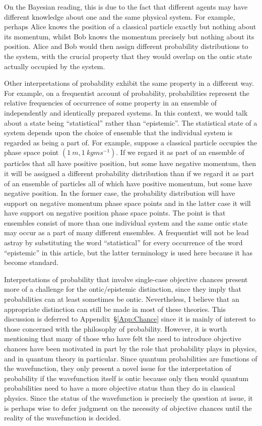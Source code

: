\documentclass[DIV=calc,paper=a4,fontsize=11pt,twocolumn]{scrartcl} %
\theoremstyle{definition}
\theoremstyle{plain}
\begin{document}
On the Bayesian reading, this is due to the fact
that different agents may have different knowledge about one and the
same physical system.  For example, perhaps Alice knows the position
of a classical particle exactly but nothing about its momentum, whilst
Bob knows the momentum precisely but nothing about its position.
Alice and Bob would then assign different probability distributions to
the system, with the crucial property that they would overlap on the
ontic state actually occupied by the system.

Other interpretations of probability exhibit the same property in a
different way.  For example, on a frequentist account of probability,
probabilities represent the relative frequencies of occurrence of some
property in an ensemble of independently and identically prepared
systems.  In this context, we would talk about a state being
``statistical'' rather than ``epistemic''.  The statistical state of a
system depends upon the choice of ensemble that the individual system
is regarded as being a part of.  For example, suppose a classical
particle occupies the phase space point $(1~m,1~kgms^{-1})$.  If we
regard it as part of an ensemble of particles that all have positive
position, but some have negative momentum, then it will be assigned a
different probability distribution than if we regard it as part of an
ensemble of particles all of which have positive momentum, but some
have negative position.  In the former case, the probability
distribution will have support on negative momentum phase space points
and in the latter case it will have support on negative position phase
space points.  The point is that ensembles consist of more than one
individual system and the same ontic state may occur as a part of many
different ensembles.  A frequentist will not be lead astray by
substituting the word ``statistical'' for every occurrence of the word
``epistemic'' in this article, but the latter terminology is used here
because it has become standard.

Interpretations of probability that involve single-case objective
chances present more of a challenge for the ontic/epistemic
distinction, since they imply that probabilities can at least
sometimes be ontic.  Nevertheless, I believe that an appropriate
distinction can still be made in most of these theories.  This
discussion is deferred to Appendix~\S\ref{App:Chance} since it is
mainly of interest to those concerned with the philosophy of
probability.  However, it is worth mentioning that many of those who
have felt the need to introduce objective chances have been motivated
in part by the role that probability plays in physics, and in quantum
theory in particular.  Since quantum probabilities are functions of
the wavefunction, they only present a novel issue for the
interpretation of probability if the wavefunction itself is ontic
because only then would quantum probabilities need to have a more
objective status than they do in classical physics.  Since the status
of the wavefunction is precisely the question at issue, it is perhaps
wise to defer judgment on the necessity of objective chances until the
reality of the wavefunction is decided.
\end{document}
